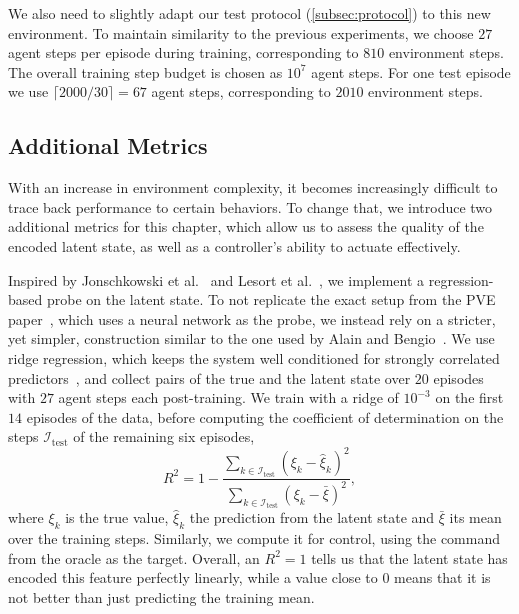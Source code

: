 We also need to slightly adapt our test protocol (\cref{subsec:protocol}) to this new environment.
To maintain similarity to the previous experiments, we choose $27$ agent steps per episode during training,
corresponding to $810$ environment steps. The overall training step budget is chosen as $10^{7}$ agent steps.
For one test episode we use $\lceil 2000/30 \rceil = 67$ agent steps, corresponding to $2010$ environment steps.

\subsection{Additional Metrics}
\label{subsec:visual-inputs-metrics}

With an increase in environment complexity, it becomes increasingly difficult to trace back performance
to certain behaviors. To change that, we introduce two additional metrics for this chapter, which allow
us to assess the quality of the encoded latent state, as well as a controller's ability to actuate effectively.

Inspired by Jonschkowski et al.~\cite[Sec.~IV-C]{Jonschkowski2017PVE} and Lesort et al.~\cite[Sec.~4.3]{Lesort2018State},
we implement a regression-based probe on the latent state.
To not replicate the exact setup from the PVE paper~\cite[Sec.~IV-C]{Jonschkowski2017PVE}, which uses a neural network as the probe,
we instead rely on a stricter, yet simpler, construction similar to the one used by Alain and Bengio~\cite{Alain2017Understanding}. We use
ridge regression, which keeps the system well conditioned for strongly correlated predictors~\cite{Hoerl1970Ridge}, and collect pairs
of the true and the latent state over $20$ episodes with $27$ agent steps each post-training. We train with a ridge of $10^{-3}$
on the first $14$ episodes of the data, before computing the coefficient of determination on the steps $\mathcal{I}_{\mathrm{test}}$ of the remaining six episodes,
\begin{equation}
  \label{eq:probe-r2}
  R^2 = 1 - \frac{\sum_{k \in \mathcal{I}_{\mathrm{test}}} (\xi_k - \hat{\xi}_k)^2}{\sum_{k \in \mathcal{I}_{\mathrm{test}}} (\xi_k - \bar{\xi})^2},
\end{equation}
where $\xi_k$ is the true value, $\hat{\xi}_k$ the prediction from the latent state and $\bar{\xi}$ its mean over the training steps.
Similarly, we compute it for control, using the command from the oracle as the target.
Overall, an $R^2 = 1$ tells us that the latent state has encoded this feature perfectly linearly,
while a value close to $0$ means that it is not better than just predicting the training mean.

